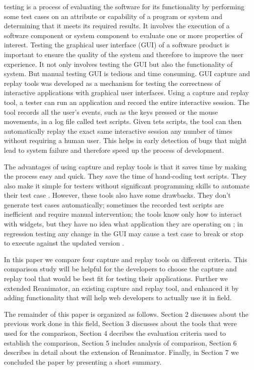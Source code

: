 \documentclass[12pt,journal]{IEEEtran}
\begin{document}
 testing is a process of  evaluating the software for its functionality by performing some test cases on an attribute or capability of a program or system and determining that it meets its required results. It involves the execution of a software component or system component to evaluate one or more properties of interest. Testing the graphical user interface (GUI) of a software product is important to ensure the quality of the system and therefore to improve the user experience\cite{Nedyalkova:2013:OSC:2494444.2494464}. It not only involves testing the GUI but also the functionality of system. But manual testing GUI is tedious and time consuming. GUI capture and replay tools was  developed as a mechanism for testing the correctness of interactive applications with graphical user interfaces. Using a capture and replay tool, a tester can run an application and record the entire interactive session. The tool records all the user's events, such as the keys pressed or the mouse movements, in a log file called test scripts. Given tets scripts, the tool can then automatically replay the exact same interactive session any number of times without requiring a human user. This helps in early detection of bugs that might lead to system failure and therefore speed up the process of development.
\par
The advantages of using capture and replay tools is that it saves time by making the process easy and quick. They save the time of hand-coding test scripts. They also make it simple for testers without significant programming skills to automate their test case \cite{McMaster:2009:EHF:1547559.1548260}. However, these tools also have some drawbacks. They don’t generate test cases automatically; sometimes the recorded test scripts are inefficient and require manual intervention; the tools know only how to interact with widgets, but they have no idea what application they are operating on \cite{michaelsilverstein2003}; in regression testing any change in the GUI may cause a test case to break or stop to execute against the updated version \cite{McMaster:2009:EHF:1547559.1548260}.
\par
In this paper we compare four capture and replay tools on different criteria. This comparison study will be helpful for the developers to choose the capture and replay tool that would be best fit for testing their applications. Further we extended Reanimator, an existing capture and replay tool, and enhanced it by adding functionality that will help web developers to actually use it in field.
\par
The remainder of this paper is organized as follows. Section 2 discusses about the previous work done in this field, Section 3 discusses about the tools that were used for the comparison, Section 4 decribes the evaluation criteria used to establish the comparison, Section 5 includes analysis of comparison, Section 6 describes in detail about the extension of Reanimator. Finally, in Section 7 we concluded the paper by presenting a short summary.
\end{document}
